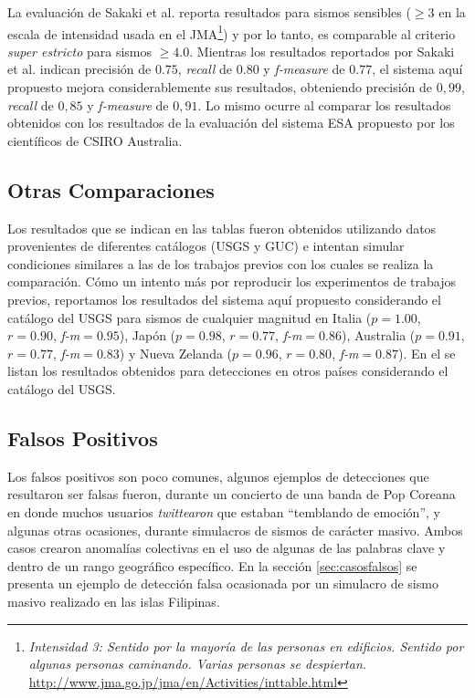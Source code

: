 La evaluación de Sakaki et al. reporta resultados para sismos sensibles ($\geq 3$ en la escala de intensidad usada en el JMA\footnote{{\em Intensidad 3: Sentido por la mayoría de las personas en edificios. Sentido por algunas personas caminando. Varias personas se despiertan.} \url{http://www.jma.go.jp/jma/en/Activities/inttable.html} }) y por lo tanto, es comparable al criterio {\em super estricto} para sismos $\geq 4.0$. Mientras los resultados reportados por Sakaki et al. indican precisión de $0.75$, {\em recall} de $0.80$ y {\em f-measure} de $0.77$, el sistema aquí propuesto mejora considerablemente sus resultados, obteniendo precisión de $0,99$, {\em recall} de $0,85$ y {\em f-measure} de $0,91$. Lo mismo ocurre al comparar los resultados obtenidos con los resultados de la evaluación del sistema ESA propuesto por los científicos de CSIRO Australia.  

\subsection{Otras Comparaciones}

Los resultados que se indican en las tablas fueron obtenidos utilizando datos provenientes de diferentes catálogos (USGS y GUC) e intentan simular condiciones similares a las de los trabajos previos con los cuales se realiza la comparación.
%
Cómo un intento más por reproducir los experimentos de trabajos previos, reportamos los resultados del sistema aquí propuesto considerando el catálogo del USGS para sismos de cualquier magnitud en Italia ($p=1.00$, $r=0.90$, {\em f-m}$=0.95$), Japón ($p=0.98$, $r=0.77$, {\em f-m}$=0.86$), Australia ($p=0.91$, $r=0.77$, {\em f-m}$=0.83$) y Nueva Zelanda ($p=0.96$, $r=0.80$, {\em f-m}$=0.87$).
%
En el  se listan los resultados obtenidos para detecciones en otros países considerando el catálogo del USGS.

 
\subsection{Falsos Positivos}

Los falsos positivos son poco comunes, algunos ejemplos de detecciones que resultaron ser falsas fueron, durante un concierto de una banda de Pop Coreana en donde muchos usuarios \textit{twittearon} que estaban ``temblando de emoción'', y algunas otras ocasiones, durante simulacros de sismos de carácter masivo. Ambos casos crearon anomalías colectivas en el uso de algunas de las palabras clave y dentro de un rango geográfico específico. En la sección \ref{sec:casosfalsos} se presenta un ejemplo de detección falsa ocasionada por un simulacro de sismo masivo realizado en las islas Filipinas. 

